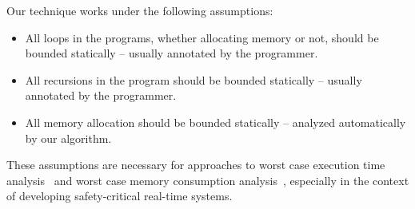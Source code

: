 {\color{red}
  
  Our technique works under the following assumptions:
  \begin{itemize}
  \item All loops in the programs, whether allocating memory or not,
    should be bounded statically -- usually annotated by the programmer.
  \item All recursions in the program should be bounded statically --
    usually annotated by the programmer.
  \item All memory allocation should be bounded statically -- analyzed
    automatically by our algorithm.
  \end{itemize}
  
  These assumptions are necessary for approaches to worst case execution
  time analysis~\cite{jop:wcet:jtres06} and worst case memory
  consumption analysis~\cite{andersen2013worst}, {\color{red} especially
    in the context of developing safety-critical real-time systems.}

}







